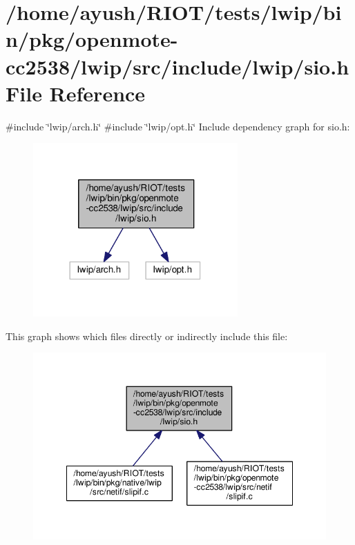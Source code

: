 \hypertarget{openmote-cc2538_2lwip_2src_2include_2lwip_2sio_8h}{}\section{/home/ayush/\+R\+I\+O\+T/tests/lwip/bin/pkg/openmote-\/cc2538/lwip/src/include/lwip/sio.h File Reference}
\label{openmote-cc2538_2lwip_2src_2include_2lwip_2sio_8h}
{\ttfamily \#include \char`\"{}lwip/arch.\+h\char`\"{}}\newline
{\ttfamily \#include \char`\"{}lwip/opt.\+h\char`\"{}}\newline
Include dependency graph for sio.\+h\+:
\nopagebreak
\begin{figure}[H]
\begin{center}
\leavevmode
\includegraphics[width=222pt]{openmote-cc2538_2lwip_2src_2include_2lwip_2sio_8h__incl}
\end{center}
\end{figure}
This graph shows which files directly or indirectly include this file\+:
\nopagebreak
\begin{figure}[H]
\begin{center}
\leavevmode
\includegraphics[width=348pt]{openmote-cc2538_2lwip_2src_2include_2lwip_2sio_8h__dep__incl}
\end{center}
\end{figure}

